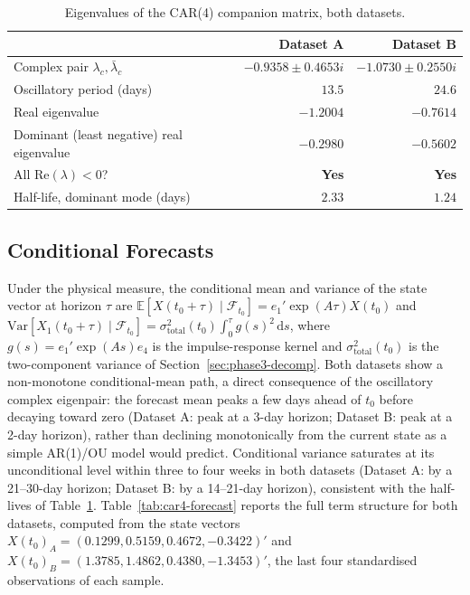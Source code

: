 \documentclass[11pt, a4paper, twoside]{article}
\begin{document}
\begin{table}[htbp]
\centering
\caption{Eigenvalues of the CAR(4) companion matrix, both datasets.}
\label{tab:car4-eigen}
\begin{tabular}{l r r}
\toprule
& \textbf{Dataset A} & \textbf{Dataset B} \\
\midrule
Complex pair $\lambda_{c},\bar\lambda_{c}$ & $-0.9358 \pm 0.4653i$ & $-1.0730 \pm 0.2550i$ \\
Oscillatory period (days) & $13.5$ & $24.6$ \\
Real eigenvalue & $-1.2004$ & $-0.7614$ \\
Dominant (least negative) real eigenvalue & $-0.2980$ & $-0.5602$ \\
All $\mathrm{Re}(\lambda) < 0$? & \textbf{Yes} & \textbf{Yes} \\
Half-life, dominant mode (days) & $2.33$ & $1.24$ \\
\bottomrule
\end{tabular}
\end{table}

\subsection{Conditional Forecasts}
\label{sec:phase4-forecast}

Under the physical measure, the conditional mean and variance of the state vector at horizon $\tau$ are $\mathbb E[X(t_0+\tau)\mid\mathcal F_{t_0}] = e_1' \exp(A\tau) X(t_0)$ and $\mathrm{Var}[X_1(t_0+\tau)\mid\mathcal F_{t_0}] = \sigma^2_{\text{total}}(t_0)\int_0^\tau g(s)^2\,\mathrm ds$, where $g(s) = e_1'\exp(As)e_4$ is the impulse-response kernel and $\sigma^2_{\text{total}}(t_0)$ is the two-component variance of Section~\ref{sec:phase3-decomp}. Both datasets show a non-monotone conditional-mean path, a direct consequence of the oscillatory complex eigenpair: the forecast mean peaks a few days ahead of $t_0$ before decaying toward zero (Dataset A: peak at a 3-day horizon; Dataset B: peak at a 2-day horizon), rather than declining monotonically from the current state as a simple AR(1)/OU model would predict. Conditional variance saturates at its unconditional level within three to four weeks in both datasets (Dataset A: by a 21--30-day horizon; Dataset B: by a 14--21-day horizon), consistent with the half-lives of Table~\ref{tab:car4-eigen}. Table~\ref{tab:car4-forecast} reports the full term structure for both datasets, computed from the state vectors $X(t_0)_A = (0.1299, 0.5159, 0.4672, -0.3422)'$ and $X(t_0)_B = (1.3785, 1.4862, 0.4380, -1.3453)'$, the last four standardised observations of each sample.
\end{document}
